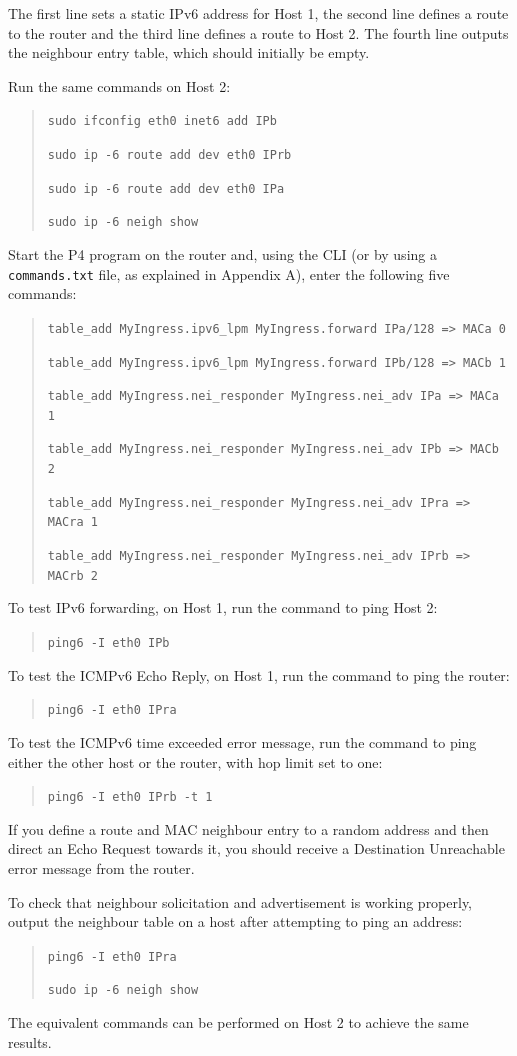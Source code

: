 The first line sets a static IPv6 address for Host 1, the second line defines a route to the router and the third line defines a route to Host 2. The fourth line outputs the neighbour entry table, which should initially be empty. 

Run the same commands on Host 2:
\begin{quote}
    \texttt{sudo ifconfig eth0 inet6 add IPb}

    \texttt{sudo ip -6 route add dev eth0 IPrb}

    \texttt{sudo ip -6 route add dev eth0 IPa}
    
    \texttt{sudo ip -6 neigh show}
\end{quote}

Start the P4 program on the router and, using the CLI (or by using a \texttt{commands.txt} file, as explained in Appendix A), enter the following five commands:

\begin{quote}
    \texttt{table\_add MyIngress.ipv6\_lpm MyIngress.forward IPa/128 => MACa 0}
    
    \texttt{table\_add MyIngress.ipv6\_lpm MyIngress.forward IPb/128 => MACb 1}
    
    \texttt{table\_add MyIngress.nei\_responder MyIngress.nei\_adv IPa => MACa 1}
    
    \texttt{table\_add MyIngress.nei\_responder MyIngress.nei\_adv IPb => MACb 2}
    
    \texttt{table\_add MyIngress.nei\_responder MyIngress.nei\_adv IPra => MACra 1}
    
    \texttt{table\_add MyIngress.nei\_responder MyIngress.nei\_adv IPrb => MACrb 2}
\end{quote}

To test IPv6 forwarding, on Host 1, run the command to ping Host 2:
\begin{quote}
    \texttt{ping6 -I eth0 IPb}
\end{quote}

To test the ICMPv6 Echo Reply, on Host 1, run the command to ping the router:
\begin{quote}
    \texttt{ping6 -I eth0 IPra}
\end{quote}

To test the ICMPv6 time exceeded error message, run the command to ping either the other host or the router, with hop limit set to one:
\begin{quote}
    \texttt{ping6 -I eth0 IPrb -t 1}
\end{quote}

If you define a route and MAC neighbour entry to a random address and then direct an Echo Request towards it, you should receive a Destination Unreachable error message from the router.

To check that neighbour solicitation and advertisement is working properly, output the neighbour table on a host after attempting to ping an address:
\begin{quote}
    \texttt{ping6 -I eth0 IPra}
    
    \texttt{sudo ip -6 neigh show}
\end{quote}

The equivalent commands can be performed on Host 2 to achieve the same results.